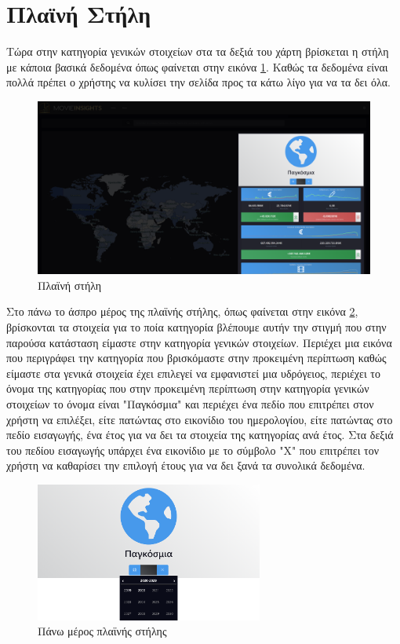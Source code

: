 \section{Πλαϊνή Στήλη}
Τώρα στην κατηγορία γενικών στοιχείων στα τα δεξιά του χάρτη βρίσκεται η στήλη με κάποια βασικά δεδομένα όπως φαίνεται στην εικόνα \ref{demo:sidebar}. Καθώς τα δεδομένα είναι πολλά πρέπει ο χρήστης να κυλίσει την σελίδα προς τα κάτω λίγο για να τα δει όλα. 

\begin{figure}[h]
  \centering
  \includegraphics[width=145mm]{Chapters/6 - Manual/Images/main_page_sidebar.png}
  \caption{Πλαϊνή στήλη}
  \label{demo:sidebar}
\end{figure}

Στο πάνω το άσπρο μέρος της πλαϊνής στήλης, όπως φαίνεται στην εικόνα \ref{demo:sidebar_top}, βρίσκονται τα στοιχεία για το ποία κατηγορία βλέπουμε αυτήν την στιγμή που στην παρούσα κατάσταση είμαστε στην κατηγορία γενικών στοιχείων.
Περιέχει μια εικόνα που περιγράφει την κατηγορία που βρισκόμαστε στην προκειμένη περίπτωση καθώς είμαστε στα γενικά στοιχεία έχει επιλεγεί να εμφανιστεί μια υδρόγειος, περιέχει το όνομα της κατηγορίας που στην προκειμένη περίπτωση στην κατηγορία γενικών στοιχείων το όνομα είναι "Παγκόσμια" και περιέχει ένα πεδίο που επιτρέπει στον χρήστη να επιλέξει, είτε πατώντας στο εικονίδιο του ημερολογίου, είτε πατώντας στο πεδίο εισαγωγής, ένα έτος για να δει τα στοιχεία της κατηγορίας ανά έτος. Στα δεξιά του πεδίου εισαγωγής υπάρχει ένα εικονίδιο με το σύμβολο "X" που επιτρέπει τον χρήστη να καθαρίσει την επιλογή έτους για να δει ξανά τα συνολικά δεδομένα.

\begin{figure}[h]
  \centering
  \includegraphics[width=75mm]{Chapters/6 - Manual/Images/main_page_sidebar_top.png}
  \caption{Πάνω μέρος πλαϊνής στήλης}
  \label{demo:sidebar_top}
\end{figure}

